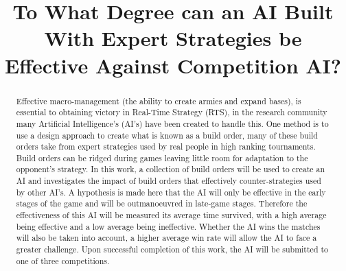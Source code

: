\documentclass[journal]{IEEEtran}
\begin{document}
%
\title{%
	To What Degree can an AI Built With Expert Strategies be Effective Against Competition AI?} %

%
%
\author{
}


\maketitle

\begin{abstract}
Effective macro-management (the ability to create armies and expand bases), is essential to obtaining victory in Real-Time Strategy (RTS), in the research community many Artificial Intelligence's (AI's) have been created to handle this. One method is to use a design approach to create what is known as a build order, many of these build orders take from expert strategies used by real people in high ranking tournaments. Build orders can be ridged during games leaving little room for adaptation to the opponent's strategy. In this work, a collection of build orders will be used to create an AI and investigates the impact of build orders that effectively counter-strategies used by other AI's. A hypothesis is made here that the AI will only be effective in the early stages of the game and will be outmanoeuvred in late-game stages. Therefore the effectiveness of this AI will be measured its average time survived, with a high average being effective and a low average being ineffective. Whether the AI wins the matches will also be taken into account, a higher average win rate will allow the AI to face a greater challenge. Upon successful completion of this work, the AI will be submitted to one of three competitions.
\end{abstract}
\end{document}

